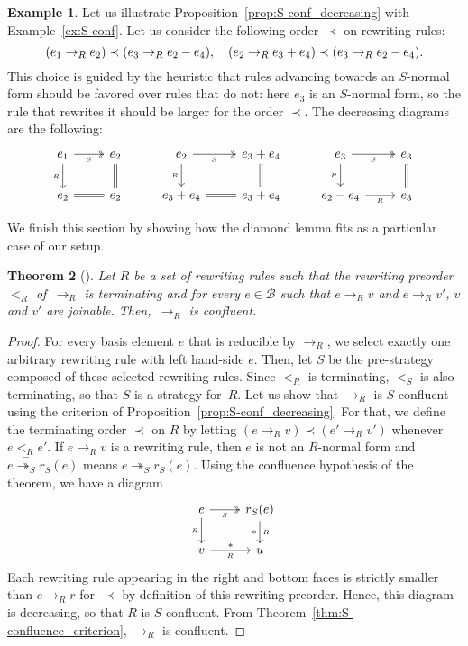 \documentclass[11pt]{article}
\newtheorem{theorem}{Theorem}[section]
\theoremstyle{definition}
\newtheorem{example}[theorem]{Example}
\newcommand\basis{\mathscr{B}}
\newcommand\ordS{<_S}
\newcommand\rewR{\to_R}
\newcommand\parS{\twoheadrightarrow_S}
\begin{document}
\begin{example}\label{ex:end_to_example}
  Let us illustrate Proposition~\ref{prop:S-conf_decreasing} with
  Example~\ref{ex:S-conf}. Let us consider the following order $\prec$ on
  rewriting rules:
  \[(e_1\rewR e_2)\prec(e_3\rewR e_2-e_4),\quad(e_2\rewR e_3+e_4)\prec
  (e_3\rewR e_2-e_4).
  \smallskip\]
  This choice is guided by the heuristic that rules advancing towards an
  $S$-normal form should be favored over rules that do not: here $e_3$ is
  an $S$-normal form, so the rule that rewrites it should be larger for
  the order $\prec$. The decreasing diagrams are the following:
  \[\begin{tikzcd}
  e_1\ar[d, "_R"']\ar[r, twoheadrightarrow, "_S"'] &
  e_2\ar[d, equal] & e_2\ar[d, "_R"']
  \ar[r, twoheadrightarrow, "_S"'] & e_3+e_4\ar[d, equal] &
  e_3\ar[d, "_R"']\ar[r, twoheadrightarrow, "_S"'] & e_3\ar[d,equal]\\
  e_2\ar[r, equal] & e_2 & e_3+e_4\ar[r, equal] & e_3+e_4 & e_2-e_4
  \ar[r,  "_R"'] & e_3
  \end{tikzcd}\]
\end{example}
\smallskip

We finish this section by showing how the diamond lemma fits as a
particular case of our setup.
\medskip

\begin{theorem}[\cite{MR506890}]\label{thm:diamond_lemma}
  Let $R$ be a set of rewriting rules such that the rewriting preorder
  $<_R$ of~$\rewR$ is terminating and for every $e\in\basis$ such that
  $e\rewR v$ and $e\rewR v'$, $v$ and $v'$ are joinable. Then,~$\rewR$ is
  confluent.
\end{theorem}

\begin{proof}
  For every basis element $e$ that is reducible by $\rewR$, we select
  exactly one arbitrary rewriting rule with left hand-side
  $e$. Then, let $S$ be the pre-strategy composed of these selected
  rewriting rules. Since $<_R$ is terminating, $\ordS$ is also
  terminating, so that $S$ is a strategy for~$R$. Let us show that
  $\rewR$ is $S$-confluent using the criterion of
  Proposition~\ref{prop:S-conf_decreasing}. For that, we define the
  terminating order $\prec$ on $R$ by letting
  $(e\rewR v)\prec(e'\rewR v')$  whenever $e<_Re'$. If $e\rewR v$ is a
  rewriting rule, then $e$ is not an $R$-normal form and
  $e\overset{=}{\parS}r_S(e)$ means $e\parS r_S(e)$. Using the confluence
  hypothesis of the theorem, we have a diagram
  \[\begin{tikzcd}
  e\ar[d, "_R"']\ar[r, twoheadrightarrow, "_S"'] &
  r_S(e)\ar[d, rightarrow, "*"', "_R"]\\
  v\ar[r, rightarrow, "*", "_R"'] & u
  \end{tikzcd}\]
  Each rewriting rule appearing in the right and bottom faces is strictly
  smaller than $e\rewR r$ for~$\prec$ by definition of this rewriting
  preorder. Hence, this diagram is decreasing, so that $R$ is
  $S$-confluent. From Theorem~\ref{thm:S-confluence_criterion}, $\rewR$
  is confluent.   
\end{proof}
\smallskip
\end{document}

